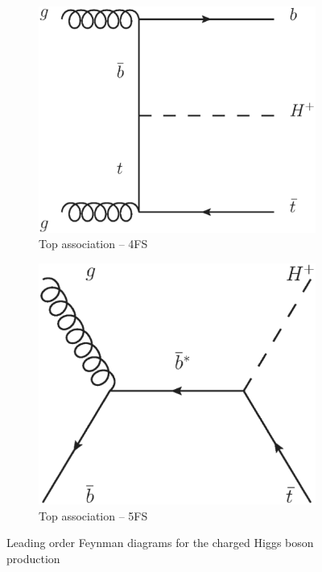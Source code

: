 \begin{figure}[!h]
\centering
\begin{subfigure}{0.4\textwidth}
   \includegraphics[width=\textwidth]{figures/feynmanIIIa.eps}
\caption{Top association -- 4FS}
\end{subfigure} %
\begin{subfigure}{0.4\textwidth}
   \includegraphics[width=\textwidth]{figures/feynmanIIa.eps}
\caption{Top association -- 5FS}
\end{subfigure} %
\caption{Leading order Feynman diagrams for the charged Higgs boson production}
\label{fig:chargedFeynV1}
\end{figure}


